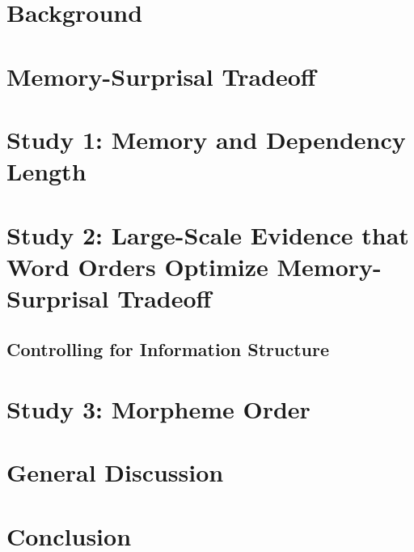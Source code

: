 \documentclass[11pt,letterpaper]{article}
\begin{document}
\section{Background}\label{sec:background}





\section{Memory-Surprisal Tradeoff}\label{sec:ms-tradeoff}



\section{Study 1: Memory and Dependency Length}\label{sec:toy-study}





\section{Study 2: Large-Scale Evidence that Word Orders Optimize Memory-Surprisal Tradeoff}
\label{sec:main-experiment}



\subsection{Controlling for Information Structure}\label{subsec:freedom}



\section{Study 3: Morpheme Order}\label{sec:morphemes}




\section{General Discussion}\label{sec:discussion}




\section{Conclusion}\label{sec:conclusion}
\end{document}
